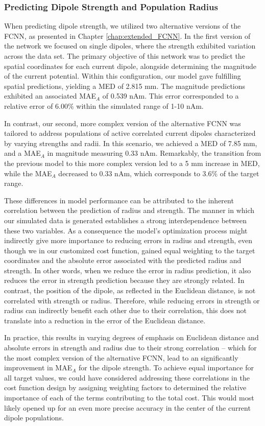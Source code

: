 \documentclass[a4paper, UKenglish, 11pt]{uiomaster}
\begin{document}
\subsubsection{Predicting Dipole Strength and Population Radius}

When predicting dipole strength, we utilized two alternative versions of the FCNN, as presented in Chapter \ref{chap:extended_FCNN}. In the first version of the network we focused on single dipoles, where the strength exhibited variation across the data set. The primary objective of this network was to predict the spatial coordinates for each current dipole, alongside determining the magnitude of the current potential. Within this configuration, our model gave fulfilling spatial predictions, yielding a MED of 2.815 mm. The magnitude predictions exhibited an associated MAE$_{A}$ of 0.539 nAm. This error corresponded to a relative error of 6.00$\%$ within the simulated range of 1-10 nAm.

In contrast, our second, more complex version of the alternative FCNN was tailored to address populations of active correlated current dipoles characterized by varying strengths and radii. In this scenario, we achieved a MED of 7.85 mm, and a MAE$_A$ in magnitude measuring 0.33 nAm. Remarkably, the transition from the previous model to this more complex version led to a 5 mm increase in MED, while the MAE$_{A}$ decreased to 0.33 nAm, which corresponds to 3.6$\%$ of the target range.

These differences in model performance can be attributed to the inherent correlation between the prediction of radius and strength. The manner in which our simulated data is generated establishes a strong interdependence between these two variables. As a consequence the model's optimization process might indirectly give more importance to reducing errors in radius and strength, even though we in our customized cost function, gained equal weighting to the target coordinates and the absolute error associated with the predicted radius and strength. In other words, when we reduce the error in radius prediction, it also reduces the error in strength prediction because they are strongly related. In contrast, the position of the dipole, as reflected in the Euclidean distance, is not correlated with strength or radius. Therefore, while reducing errors in strength or radius can indirectly benefit each other due to their correlation, this does not translate into a reduction in the error of the Euclidean distance.

In practice, this results in varying degrees of emphasis on Euclidean distance and absolute errors in strength and radius due to their strong correlation -- which for the most complex version of the alternative FCNN, lead to an significantly improvement in MAE$_{A}$ for the dipole strength. To achieve equal importance for all target values, we could have considered addressing these correlations in the cost function design by assigning weighting factors to determined the relative importance of each of the terms contributing to the total cost. This would most likely opened up for an even more precise accuracy in the center of the current dipole populations.
\end{document}
